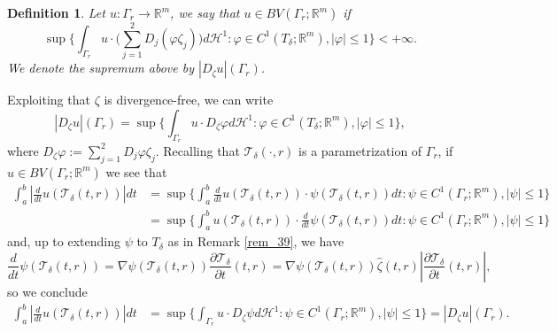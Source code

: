 \documentclass[a4paper,11pt]{article}
\numberwithin{equation}{section}
\newtheorem{definition}[theorem]{Definition}
\newcommand{\R}{\mathbb{R}}
\begin{document}
\begin{definition}\label{tang_der}
Let $u:\Gamma_r\rightarrow \R^m$, we say that $u\in BV(\Gamma_{r};\R^m)$ if 
$$\sup\{\int_{\Gamma_r}u\cdot\Big(\sum_{j=1}^2D_j(\varphi \zeta_j)\Big)d\mathcal H^1:\varphi\in C^1(T_\delta;\R^m),|\varphi|\leq 1\}<+\infty.$$
We denote the supremum above by $|D_\zeta u|(\Gamma_r)$.
\end{definition}

Exploiting that $\zeta$ is divergence-free, we can write
$$|D_\zeta u|(\Gamma_{r})=\sup\{\int_{\Gamma_r}u\cdot D_\zeta\varphi d\mathcal H^1:\varphi\in C^1(T_\delta;\R^m),|\varphi|\leq 1\},$$
where $D_\zeta\varphi:=\sum_{j=1}^2D_j\varphi\zeta_j$.
Recalling that $\mathcal T_\delta(\cdot,r)$ is a parametrization of $\Gamma_r$, if $u\in BV(\Gamma_r;\R^m)$ we see that 
\begin{align*}
\int_{a}^b|\frac{d}{dt}u(\mathcal T_\delta(t,r))|dt&=\sup\{\int_a^b\frac{d}{dt}u(\mathcal T_\delta(t,r))\cdot \psi(\mathcal T_\delta(t,r))dt:\psi\in C^1(\Gamma_r;\R^m), |\psi|\leq 1\}\\
&=\sup\{\int_a^bu(\mathcal T_\delta(t,r))\cdot \frac{d}{dt}\psi(\mathcal T_\delta(t,r))dt:\psi\in C^1(\Gamma_r;\R^m), |\psi|\leq 1\}
\end{align*}
and, up to  extending $\psi$ to  $T_\delta$ as in Remark \ref{rem_39}, we have
$$\frac{d}{dt}\psi(\mathcal T_\delta(t,r))=\nabla \psi(\mathcal T_\delta(t,r))\frac{\partial \mathcal T_\delta}{\partial t}(t,r)=\nabla \psi(\mathcal T_\delta(t,r))\widehat\zeta(t,r)|\frac{\partial \mathcal T_\delta}{\partial t}(t,r)|,$$
so we conclude
\begin{align}\label{Dugammar}
	\int_{a}^b|\frac{d}{dt}u(\mathcal T_\delta(t,r))|dt
	&=\sup\{\int_{\Gamma_r}u\cdot D_\zeta\psi d\mathcal H^1:\psi\in C^1(\Gamma_r;\R^m), |\psi|\leq 1\}=|D_\zeta u|(\Gamma_{r}).
\end{align}
\end{document}
